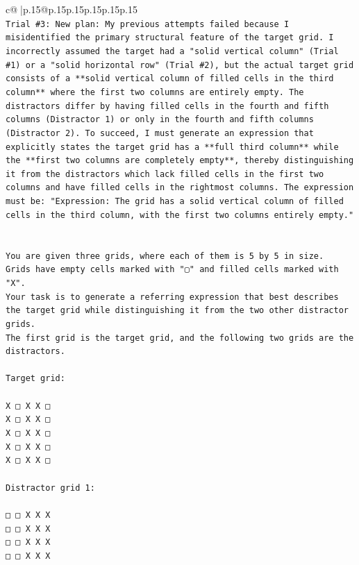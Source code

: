 \documentclass{article}
\begin{document}
{\begin{supertabular}{c@{$\;$}|p{.15\linewidth}@{}p{.15\linewidth}p{.15\linewidth}p{.15\linewidth}p{.15\linewidth}p{.15\linewidth}}
{{{\\ 
\texttt{Trial \#3: New plan: My previous attempts failed because I misidentified the primary structural feature of the target grid. I incorrectly assumed the target had a "solid vertical column" (Trial \#1) or a "solid horizontal row" (Trial \#2), but the actual target grid consists of a **solid vertical column of filled cells in the third column** where the first two columns are entirely empty. The distractors differ by having filled cells in the fourth and fifth columns (Distractor 1) or only in the fourth and fifth columns (Distractor 2). To succeed, I must generate an expression that explicitly states the target grid has a **full third column** while the **first two columns are completely empty**, thereby distinguishing it from the distractors which lack filled cells in the first two columns and have filled cells in the rightmost columns. The expression must be: "Expression: The grid has a solid vertical column of filled cells in the third column, with the first two columns entirely empty."} \\
\\ 
\\ 
\texttt{You are given three grids, where each of them is 5 by 5 in size.} \\
\texttt{Grids have empty cells marked with "▢" and filled cells marked with "X".} \\
\texttt{Your task is to generate a referring expression that best describes the target grid while distinguishing it from the two other distractor grids.} \\
\texttt{The first grid is the target grid, and the following two grids are the distractors.} \\
\\ 
\texttt{Target grid:} \\
\\ 
\texttt{X □ X X □} \\
\texttt{X □ X X □} \\
\texttt{X □ X X □} \\
\texttt{X □ X X □} \\
\texttt{X □ X X □} \\
\\ 
\texttt{Distractor grid 1:} \\
\\ 
\texttt{□ □ X X X} \\
\texttt{□ □ X X X} \\
\texttt{□ □ X X X} \\
\texttt{□ □ X X X} \\
}}}
\end{supertabular}}
\end{document}
